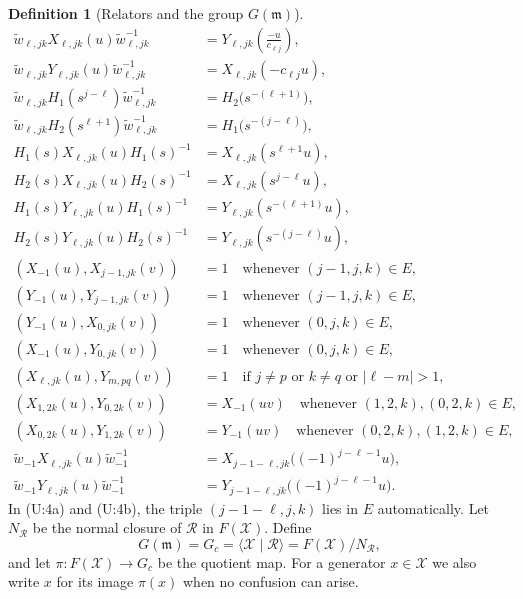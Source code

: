 \documentclass[11pt]{article}
\theoremstyle{definition}
\newtheorem{definition}[theorem]{Definition}
\theoremstyle{remark}
\newcommand{\wt}{\widetilde{w}}
\begin{document}
\begin{definition}[Relators and the group $G(\mathfrak{m})$]
\begin{align*}
\wt_{\ell,jk}X_{\ell,jk}(u)\wt_{\ell,jk}^{-1}&=Y_{\ell,jk}\!\left(\frac{-u}{c_{\ell j}}\right), \tag{Im:4a}\\
\wt_{\ell,jk}Y_{\ell,jk}(u)\wt_{\ell,jk}^{-1}&=X_{\ell,jk}(-c_{\ell j}u), \tag{Im:4b}\\
\wt_{\ell,jk}H_1(s^{j-\ell})\wt_{\ell,jk}^{-1}&=H_2\big(s^{-(\ell+1)}\big), \tag{Im:5a}\\
\wt_{\ell,jk}H_2(s^{\ell+1})\wt_{\ell,jk}^{-1}&=H_1\big(s^{-(j-\ell)}\big), \tag{Im:5b}\\
H_1(s)X_{\ell,jk}(u)H_1(s)^{-1}&=X_{\ell,jk}(s^{\ell+1}u), \tag{Im:6a}\\
H_2(s)X_{\ell,jk}(u)H_2(s)^{-1}&=X_{\ell,jk}(s^{j-\ell}u), \tag{Im:6b}\\
H_1(s)Y_{\ell,jk}(u)H_1(s)^{-1}&=Y_{\ell,jk}(s^{-(\ell+1)}u), \tag{Im:6c}\\
H_2(s)Y_{\ell,jk}(u)H_2(s)^{-1}&=Y_{\ell,jk}(s^{-(j-\ell)}u), \tag{Im:6d}\\
(X_{-1}(u),X_{j-1,jk}(v))&=1 \quad\text{whenever } (j-1,j,k)\in E, \tag{U:1a}\\
(Y_{-1}(u),Y_{j-1,jk}(v))&=1 \quad\text{whenever } (j-1,j,k)\in E, \tag{U:1b}\\
(Y_{-1}(u),X_{0,jk}(v))&=1 \quad\text{whenever } (0,j,k)\in E, \tag{U:1c}\\
(X_{-1}(u),Y_{0,jk}(v))&=1 \quad\text{whenever } (0,j,k)\in E, \tag{U:1d}\\
(X_{\ell,jk}(u),Y_{m,pq}(v))&=1 \quad\text{if } j\ne p \text{ or } k\ne q \text{ or } |\ell-m|>1, \tag{U:2}\\
(X_{1,2k}(u),Y_{0,2k}(v))&=X_{-1}(uv) \quad\text{whenever } (1,2,k),(0,2,k)\in E, \tag{U:3a}\\
(X_{0,2k}(u),Y_{1,2k}(v))&=Y_{-1}(uv) \quad\text{whenever } (0,2,k),(1,2,k)\in E, \tag{U:3b}\\
\wt_{-1}X_{\ell,jk}(u)\wt_{-1}^{-1}&=X_{j-1-\ell,jk}\big((-1)^{j-\ell-1}u\big), \tag{U:4a}\\
\wt_{-1}Y_{\ell,jk}(u)\wt_{-1}^{-1}&=Y_{j-1-\ell,jk}\big((-1)^{j-\ell-1}u\big). \tag{U:4b}
\end{align*}
In (U:4a) and (U:4b), the triple $(j-1-\ell,j,k)$ lies in $E$ automatically. Let $N_{\mathcal{R}}$ be the normal closure of $\mathcal{R}$ in $F(\mathcal{X})$. Define
\[
G(\mathfrak{m})=G_c=\langle\mathcal{X}\mid\mathcal{R}\rangle=F(\mathcal{X})/N_{\mathcal{R}},
\]
and let $\pi\colon F(\mathcal{X})\to G_c$ be the quotient map. For a generator $x\in\mathcal{X}$ we also write $x$ for its image $\pi(x)$ when no confusion can arise.
\end{definition}
\end{document}
